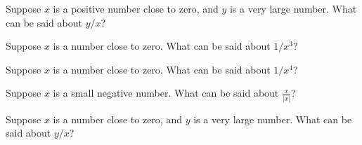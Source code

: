 \documentclass{ximera}
\newcommand{\recommendation}[1]{}
\begin{document}

\begin{problem}
\recommendation{Vic}
  Suppose $x$ is a positive number close to zero, and $y$ is a very large number.  What can be said about $y/x$?
  \begin{multipleChoice}
  \end{multipleChoice}
\end{problem}

\begin{problem}
  Suppose $x$ is a number close to zero.  What can be said about $1/x^3$?
  \begin{multipleChoice}
  \end{multipleChoice}
\end{problem}

\begin{problem}
  Suppose $x$ is a number close to zero.  What can be said about $1/x^4$?
  \begin{multipleChoice}
  \end{multipleChoice}
\end{problem}

\begin{problem}
  Suppose $x$ is a small negative number.  What can be said about $\frac{x}{|x|}$?
  \begin{multipleChoice}
  \end{multipleChoice}
\end{problem}

\begin{problem}
  Suppose $x$ is a number close to zero, and $y$ is a very large number.  What can be said about $y/x$?
  \begin{multipleChoice}
  \end{multipleChoice}
\end{problem}
\end{document}
